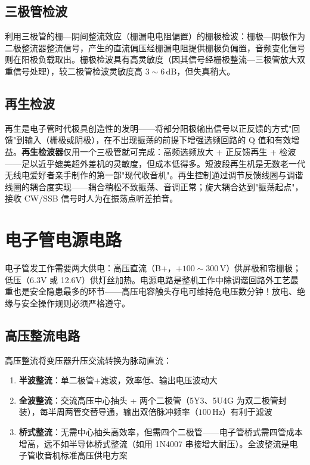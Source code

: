 \documentclass[12pt,UTF8]{ctexbook}
\begin{document}
\subsection{三极管检波}

利用三极管的栅—阴间整流效应（栅漏电电阻偏置）的栅极检波：栅极—阴极作为二极整流器整流信号，产生的直流偏压经栅漏电阻提供栅极负偏置，音频变化信号则在阳极负载取出。栅极检波具有高灵敏度（因其信号经栅极整流—三极管放大双重信号处理），较二极管检波灵敏度高 $3\sim6\,\mathrm{dB}$，但失真稍大。

\subsection{再生检波}

再生是电子管时代极具创造性的发明——将部分阳极输出信号以正反馈的方式"回馈"到输入（栅极或阴极），在不出现振荡的前提下增强选频回路的 Q 值和有效增益。\textbf{再生检波器}仅用一个三极管就可完成：高频选频放大 + 正反馈再生 + 检波——足以近乎媲美超外差机的灵敏度，但成本低得多。短波段再生机是无数老一代无线电爱好者亲手制作的第一部"现代收音机"。再生控制通过调节反馈线圈与调谐线圈的耦合度实现——耦合稍松不致振荡、音调正常；旋大耦合达到"振荡起点"，接收 CW/SSB 信号时人为在振荡点听差拍音。

\section{电子管电源电路}
\label{sec:tube_power_supply}

电子管发工作需要两大供电：高压直流（B+，$+100\sim300\,\mathrm{V}$）供屏极和帘栅极；低压（6.3V 或 12.6V）供灯丝加热。电源电路是整机工作中除调谐回路外工艺最重也是安全隐患最多的环节——高压电容触头存电可维持危电压数分钟！放电、绝缘与安全操作规则必须严格遵守。

\subsection{高压整流电路}

高压整流将变压器升压交流转换为脉动直流：
\begin{enumerate}
\item \textbf{半波整流}：单二极管+滤波，效率低、输出电压波动大
\item \textbf{全波整流}：交流高压中心抽头 + 两个二极管（5Y3、5U4G 为双二极管封装），每半周两管交替导通，输出双倍脉冲频率（$100\,\mathrm{Hz}$）有利于滤波
\item \textbf{桥式整流}：无需中心抽头高效率，但需四个二极管——电子管桥式需四管成本增高，远不如半导体桥式整流（如用 1N4007 串接增大耐压）。全波整流是电子管收音机标准高压供电方案
\end{enumerate}
\end{document}
